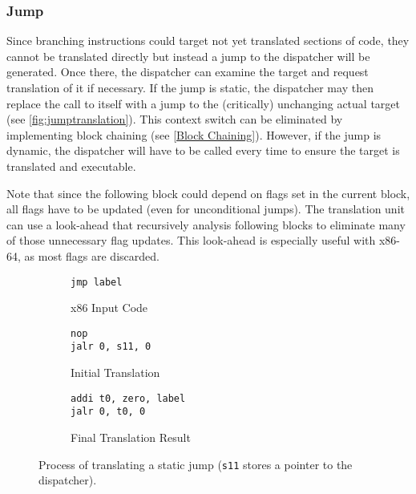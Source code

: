 	\subsubsection{Jump}
	\label{translating conditional jumps}
	Since branching instructions could target not yet translated sections of code, they cannot be translated directly but instead a jump to the dispatcher will be generated. Once there, the dispatcher can examine the target and request translation of it if necessary. If the jump is static, the dispatcher may then replace the call to itself with a jump to the (critically) unchanging actual target (see \autoref{fig:jumptranslation}). This context switch can be eliminated by implementing block chaining (see \ref{Block Chaining}). However, if the jump is dynamic, the dispatcher will have to be called every time to ensure the target is translated and executable.
	
	Note that since the following block could depend on flags set in the current block, all flags have to be updated (even for unconditional jumps). The translation unit can use a look-ahead that recursively analysis following blocks to eliminate many of those unnecessary flag updates. This look-ahead is especially useful with x86-64, as most flags are discarded.
	
	\begin{figure}[htb]
	\centering
	\begin{subfigure}[b]{0.33\textwidth}
		\centering
		\begin{lstlisting}[frame=none,xleftmargin=1.3cm]
jmp label
		\end{lstlisting}
		\caption{x86 Input Code}
		\label{fig:jumptranslation-x86in}
	\end{subfigure}%
	\begin{subfigure}[b]{.33\textwidth}
		\centering
		\begin{lstlisting}[frame=none,xleftmargin=1.1cm]
nop
jalr 0, s11, 0
		\end{lstlisting}
		\caption{Initial Translation}
		\label{fig:jumptranslation-beforedispatcher}
	\end{subfigure}
	\begin{subfigure}[b]{.33\textwidth}
		\centering
		\begin{lstlisting}[frame=none,xleftmargin=0.7cm]
addi t0, zero, label
jalr 0, t0, 0	
		\end{lstlisting}
		\caption{Final Translation Result}
		\label{fig:jumptranslation-afterdispatcher}
	\end{subfigure}
	\caption{Process of translating a static jump (\texttt{s11} stores a pointer to the dispatcher).}
	\label{fig:jumptranslation}
\end{figure}
	
